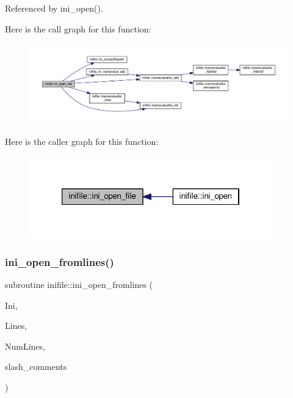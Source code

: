 Referenced by ini\+\_\+open().

Here is the call graph for this function\+:
\nopagebreak
\begin{figure}[H]
\begin{center}
\leavevmode
\includegraphics[width=350pt]{namespaceinifile_a18f4ff3cc821f6e027b4aefa829f4b41_cgraph}
\end{center}
\end{figure}
Here is the caller graph for this function\+:
\nopagebreak
\begin{figure}[H]
\begin{center}
\leavevmode
\includegraphics[width=298pt]{namespaceinifile_a18f4ff3cc821f6e027b4aefa829f4b41_icgraph}
\end{center}
\end{figure}
\mbox{\label{namespaceinifile_aaece0286cd984aadae94bf1212d74f9f}} 
\subsubsection{\texorpdfstring{ini\+\_\+open\+\_\+fromlines()}{ini\_open\_fromlines()}}
{\footnotesize\ttfamily subroutine inifile\+::ini\+\_\+open\+\_\+fromlines (\begin{DoxyParamCaption}\item[{type(\mbox{\hyperlink{structinifile_1_1tinifile}{tinifile}})}]{Ini,  }\item[{character (len=$\ast$), dimension(numlines), intent(in)}]{Lines,  }\item[{integer, intent(in)}]{Num\+Lines,  }\item[{logical, intent(in)}]{slash\+\_\+comments }\end{DoxyParamCaption})}



